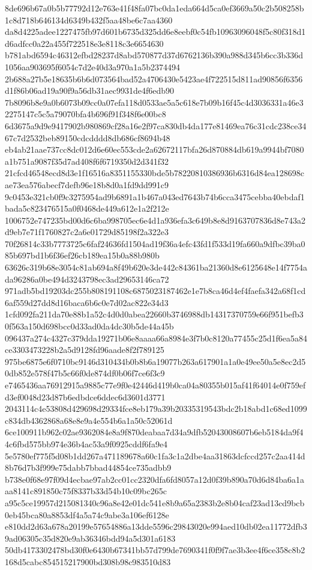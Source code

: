 \documentclass[11pt,a4paper]{article}
\begin{document}
{8de696b67a0b5b77792d12e763e41f48fa07bc0da1eda664d5ca0ef3669a50c2b508258b1c8d718b646134d6349b432f5aa48be6c7aa4360
da8d4225adee1227475fb97d601b6735d325dd6e8eebf0c54fb10963096048f5c80f318d1d6adfcc0a22a455f722518e3e8118c3e6654630
b781abd6594c46312efbd28237d8abd570877d37d6762136b390a988d345b6cc3b336d1056aa903695f6054c7d2e40d3a970a1a5b2374494
2b688a27b5e18635b6b6d073564bad52a4706430e5423ae4f722515d811ad90856f6356d1f86b06ad19a90f9a56db31aec9931de4f6edb90
7b8096b8e9a0b6073b09cc0a07efa118d0533ae5a5c618e7b09b16f45c4d3036331a46e32275147c5c5a79070bfa4b696f91f348f6e00bc8
6d3675a9d9e9417902b980869cf28a16e2f97ca830db4da177e81469ea76c31cdc238ce3467c7d2532beb89150cdcdddd8db686cf8694b48
eb4ab21aae737cc8dc012d6e60ec553cde2a62672117bfa26d870884db619a9944bf7080a1b751a9087f35d7ad408f6f6719350d2d341f32
21cfcd46548ecd8d3e1f16516a8351155330bde5b78220810386936b6316d84ea128698cae73ea576abecf7defb96e18b8d0a1fd9dd991c9
9c0453e321cb0f9c3275954ad9b6891a1b467a043ed7643b74b6cca3475cebba40ebdaf1bada5c823476515a0f0468de449a612e1a2f212e
1006752e747235bd00d6c6ba998705ec6e4d1a936efa3c649b8e8d9163707836d8e743a2d9eb7e71f1760827c2a6e01729d85198f2a322e3
70f26814c33b7773725c6faf24636fd1504ad19f36a4efc43fd1f533d19fa660a9dfbc39ba085b697bd1b6f36ef26cb189ea15b0a88b980b
63626c319b68e3054c81ab694a8f49b620e3de442c84361ba21360d8e6125648e14f7754ada96286a0be494d3243798ec3ad29653146ca72
971adb5bd19203dc255b808191108c6875023187462e1e7b8ca46d4ef4faefa342a68f1cd6af559d27dd8d16baca6b6c0e7d02ac822e34d3
1cfd092fa211da70e88b1a52c4d0d0abea22660b3746988db14317370759e66f951befb30f563a150d698bcc0d33ad0da4dc30b5de44a45b
096437a274c4327c379dda19271b06e8aaaa66a8984e3f7b0c8120a77455c25d1f6ea5a84ce3303473228b2a5d9128fd96aade8f2f789125
975be6875e6f0710bc9146d310434b0b8b6a19077b263a617901a1a0e49ee50a5e8ec2d50db852e578f47b5c66f0de874df0b06f7ce6f3c9
e7465436aa76912915a9885c77e9f0e42446d419b0ca04a80355b015af41f64014e0f759efd3ef0048d23d87b6edbdce6ddec6d3601d3771
2043114c4e53808d429698d29334fce8eb179a39b20335319543bdc2b18abd1c68ed1099c834db4362868a68e8e9a4e554b6a1a50c52061d
6ce100911b962c02ae9362084e8a9f870deabaa7d34a9dfb52043008607b6eb5184da9f44c6fbd575bb974e36b4ac53a9f0925cddf6fa9e4
5e5780ef775f5d08b1dd267a471189678a60c1fa3c1a2dbe4aa31863dcfccd257c2aa414d8b76d7b3f999e75dabb7bbad44854ce735adbb9
b738e0f68e97f09d4ecbae97ab2cc01cc2320dfa6fd8057a12d0f39b890a70d6d84ba6a1aaa8141c891850c75f8337b33d54b10c09bc265c
a95c5ce19957d215081340c96a8e42e01dc541e8b9a65a2383b2e8b04caf23ad13cd9bcb0eb45bca80a8853df4a5a74c9abe3a106ef6128e
e810dd2d63a678a20199e57654886a13dde5596c29843020e994aed10db02ea11772dfb39ad06305c35d820e9ab36346bdd94a5d301a6183
50db4173302478bd30f0e6430b67341bb57d799de7690341f0f9f7ae3b3ee4f6ce358c8b2168d5cabc854515217900bd308b98c983510d83
}
\end{document}
